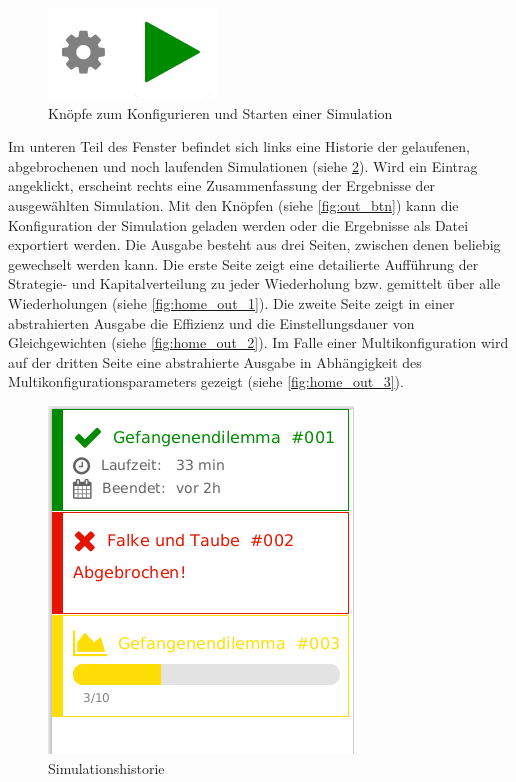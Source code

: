 \documentclass[parskip=full,11pt]{scrartcl}
\begin{document}
\begin{figure}[ht]
	\centering
 	\includegraphics[width=0.25\linewidth]{images/main_btn.png}
 	\caption{\label{fig:main_btn}
 		Knöpfe zum Konfigurieren und Starten einer Simulation}
\end{figure}


\newpage
Im unteren Teil des Fenster befindet sich links eine Historie der gelaufenen, abgebrochenen und noch laufenden Simulationen (siehe \cref{fig:history}). Wird ein Eintrag angeklickt, erscheint rechts eine Zusammenfassung der Ergebnisse der ausgewählten Simulation. Mit den Knöpfen (siehe \cref{fig:out_btn}) kann die \Gls{Konfiguration} der Simulation geladen werden oder die Ergebnisse als Datei exportiert werden. Die Ausgabe besteht aus drei Seiten, zwischen denen beliebig gewechselt werden kann. Die erste Seite zeigt eine detailierte Aufführung der Strategie- und Kapitalverteilung zu jeder Wiederholung bzw. gemittelt über alle Wiederholungen (siehe \cref{fig:home_out_1}). Die zweite Seite zeigt in einer abstrahierten Ausgabe die \Gls{Effizienz} und die \Gls{Einstellungsdauer} von Gleichgewichten (siehe \cref{fig:home_out_2}). Im Falle einer Multikonfiguration wird auf der dritten Seite eine abstrahierte Ausgabe in Abhängigkeit des Multikonfigurationsparameters gezeigt (siehe \cref{fig:home_out_3}).



\begin{figure}[hb]
	\centering
	\includegraphics[height=0.5\linewidth ]{images/history.png}
	\caption{\label{fig:history}
		Simulationshistorie }
\end{figure}
\end{document}
